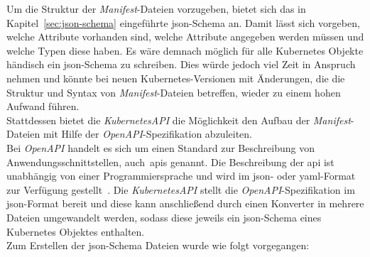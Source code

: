 Um die Struktur der \textit{Manifest}-Dateien vorzugeben, bietet sich das in Kapitel~\ref{sec:json-schema} eingeführte \acs{json}-Schema an.
Damit lässt sich vorgeben, welche Attribute vorhanden sind, welche Attribute angegeben werden müssen und welche Typen diese haben.
Es wäre demnach möglich für alle Kubernetes Objekte händisch ein \acs{json}-Schema zu schreiben. Dies würde jedoch viel Zeit in Anspruch nehmen und
könnte bei neuen Kubernetes-Versionen mit Änderungen, die die Struktur und Syntax von \textit{Manifest}-Dateien betreffen, wieder zu einem hohen Aufwand führen.
\\
Stattdessen bietet die \textit{KubernetesAPI} die Möglichkeit den Aufbau der \textit{Manifest}-Dateien mit Hilfe der \textit{OpenAPI}-Spezifikation abzuleiten.
\\
Bei \textit{OpenAPI} handelt es sich um einen Standard zur Beschreibung von Anwendungsschnittstellen, auch~\ac{apis} genannt. Die Beschreibung der \acs{api} ist
unabhängig von einer Programmiersprache und wird im \ac{json}- oder \ac{yaml}-Format zur Verfügung gestellt~\cite{openapi-org}.
Die \textit{KubernetesAPI} stellt die \textit{OpenAPI}-Spezifikation im \ac{json}-Format bereit und diese kann anschließend durch einen Konverter in
mehrere Dateien umgewandelt werden, sodass diese jeweils ein \acs{json}-Schema eines Kubernetes Objektes enthalten.
\\
Zum Erstellen der \acs{json}-Schema Dateien wurde wie folgt vorgegangen:

